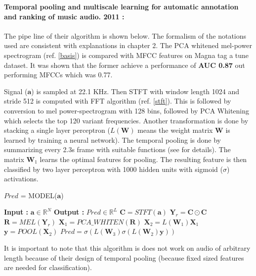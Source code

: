 \noindent \textbf{Temporal pooling and multiscale learning for automatic annotation and ranking of music audio. 2011 \cite{featurelearn1}:}\\
\\
\noindent The pipe line of their algorithm is shown below. The formalism of the notations used are consistent with explanations in chapter 2. The PCA whitened mel-power spectrogram (ref. \ref{basis}) is compared with MFCC features on Magna tag a tune dataset. It was shown that the former achieve a performance of \textbf{AUC 0.87} out performing MFCCs which was 0.77.  
\bigskip

\noindent Signal ($\textbf{a}$) is sampled at 22.1 KHz. Then STFT with window length 1024 and stride 512 is computed with FFT algorithm (ref. \ref{stft}). This is followed by conversion to mel power-spectrogram with 128 bins, followed by PCA Whitening which selects the top 120 variant frequencies. Another transformation is done by stacking a single layer perceptron ($L(\textbf{W})$ means the weight matrix $\textbf{W}$ is learned by training a neural network). The temporal pooling is done by summarizing every 2.3s frame with suitable functions (see \cite{featurelearn1} for details). The matrix $\textbf{W}_{1}$ learns the optimal features for pooling. The resulting feature is then classified by two layer perceptron with 1000 hidden units with sigmoid ($\sigma$) activations.

\begin{algorithm}
  \caption{$Pred$ = MODEL($\textbf{a}$) }\label{Temporal Pooling}
  \begin{algorithmic}[1]
    \Statex \textbf{Input :} $\textbf{a} \in \mathbb{R}^{N}$
    \Statex \textbf{Output :} $Pred \in \mathbb{R}^{L}$ 
    \State $\textbf{C} = STFT(\textbf{a})$ 
    \State $\textbf{Y}_{r} = \textbf{C} \odot \textbf{C}$ 
    \State $\textbf{R} = MEL(\textbf{Y}_{r})$ 
    \State $\textbf{X}_{1} = PCA\_WHITEN(\textbf{R})$ 
    \State $\textbf{X}_{2} = L(\textbf{W}_{1})\textbf{X}_{1}$  
    \State $\textbf{y} = POOL(\textbf{X}_{2})$ 
    \State $Pred = \sigma(L(\textbf{W}_{3})\sigma(L(\textbf{W}_{2})\textbf{y}))$ 
  \end{algorithmic}
\end{algorithm}
\FloatBarrier
\noindent It is important to note that this algorithm is does not work on audio of arbitrary length because of their design of temporal pooling (because fixed sized features are needed for classification).
\bigskip

